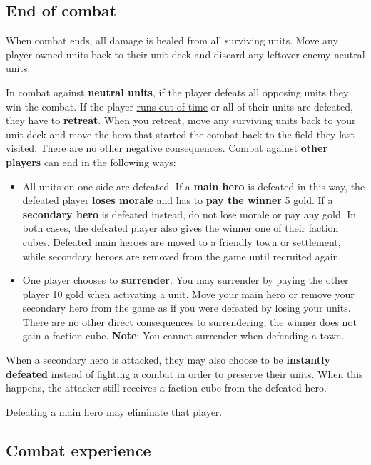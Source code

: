 \subsection*{\hypertarget{Endcombat}{End of combat}}
When combat ends, all damage is healed from all surviving units.
Move any player owned units back to their unit deck and discard any leftover enemy neutral units.\par
In combat against \textbf{neutral units}, if the player defeats all opposing units they win the combat.
If the player \hyperlink{Timelimit}{runs out of time} or all of their units are defeated, they have to \textbf{retreat}.
When you retreat, move any surviving units back to your unit deck and move the hero that started the combat back to the field they last visited.
There are no other negative consequences.
Combat against \textbf{other players} can end in the following ways:
\begin{itemize}
  \item All units on one side are defeated.
    If a \textbf{main hero} is defeated in this way, the defeated player \textbf{loses morale} and has to \textbf{pay the winner} 5 gold.
    If a \textbf{secondary hero} is defeated instead, do not lose morale or pay any gold.
    In both cases, the defeated player also gives the winner one of their \hyperlink{End}{faction cubes}.
    Defeated main heroes are moved to a friendly town or settlement, while secondary heroes are removed from the game until recruited again.
  \item One player chooses to \textbf{surrender}.
You may surrender by paying the other player 10 gold when activating a unit.
Move your main hero or remove your secondary hero from the game as if you were defeated by losing your units.
There are no other direct consequences to surrendering; the winner does not gain a faction cube.
\textbf{Note}: You cannot surrender when defending a town.
\end{itemize}
When a secondary hero is attacked, they may also choose to be \textbf{instantly defeated} instead of fighting a combat in order to preserve their units.
When this happens, the attacker still receives a faction cube from the defeated hero.\par Defeating a main hero \hyperlink{End}{may eliminate} that player.

\subsection*{\hypertarget{Combatexperience}{Combat experience}}

